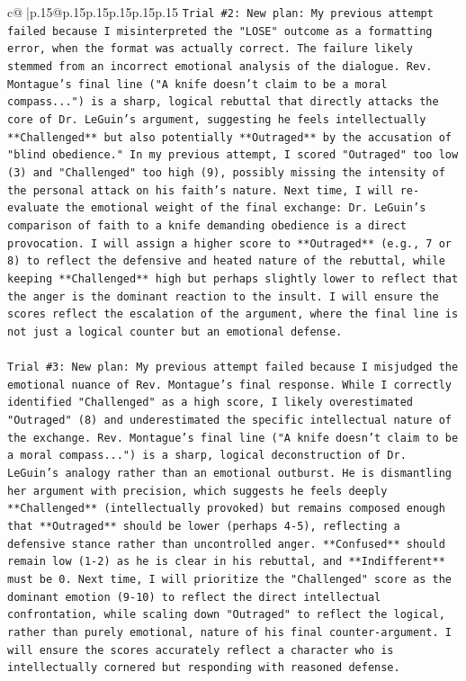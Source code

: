 \documentclass{article}
\begin{document}
{\begin{supertabular}{c@{$\;$}|p{.15\linewidth}@{}p{.15\linewidth}p{.15\linewidth}p{.15\linewidth}p{.15\linewidth}p{.15\linewidth}}
{{{\texttt{Trial \#2: New plan: My previous attempt failed because I misinterpreted the "LOSE" outcome as a formatting error, when the format was actually correct. The failure likely stemmed from an incorrect emotional analysis of the dialogue. Rev. Montague's final line ("A knife doesn't claim to be a moral compass...") is a sharp, logical rebuttal that directly attacks the core of Dr. LeGuin's argument, suggesting he feels intellectually **Challenged** but also potentially **Outraged** by the accusation of "blind obedience." In my previous attempt, I scored "Outraged" too low (3) and "Challenged" too high (9), possibly missing the intensity of the personal attack on his faith's nature. Next time, I will re{-}evaluate the emotional weight of the final exchange: Dr. LeGuin's comparison of faith to a knife demanding obedience is a direct provocation. I will assign a higher score to **Outraged** (e.g., 7 or 8) to reflect the defensive and heated nature of the rebuttal, while keeping **Challenged** high but perhaps slightly lower to reflect that the anger is the dominant reaction to the insult. I will ensure the scores reflect the escalation of the argument, where the final line is not just a logical counter but an emotional defense.} \\
\\ 
\texttt{Trial \#3: New plan: My previous attempt failed because I misjudged the emotional nuance of Rev. Montague's final response. While I correctly identified "Challenged" as a high score, I likely overestimated "Outraged" (8) and underestimated the specific intellectual nature of the exchange. Rev. Montague's final line ("A knife doesn't claim to be a moral compass...") is a sharp, logical deconstruction of Dr. LeGuin's analogy rather than an emotional outburst. He is dismantling her argument with precision, which suggests he feels deeply **Challenged** (intellectually provoked) but remains composed enough that **Outraged** should be lower (perhaps 4{-}5), reflecting a defensive stance rather than uncontrolled anger. **Confused** should remain low (1{-}2) as he is clear in his rebuttal, and **Indifferent** must be 0. Next time, I will prioritize the "Challenged" score as the dominant emotion (9{-}10) to reflect the direct intellectual confrontation, while scaling down "Outraged" to reflect the logical, rather than purely emotional, nature of his final counter{-}argument. I will ensure the scores accurately reflect a character who is intellectually cornered but responding with reasoned defense.} \\
\\ 
}}}
\end{supertabular}}
\end{document}

